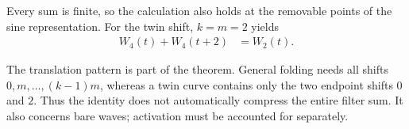 Every sum is finite, so the calculation also holds at the removable points
of the sine representation. For the twin shift, $k=m=2$ yields
\begin{equation*}
\begin{aligned}
W_4(t)+W_4(t+2)&=W_2(t).
\end{aligned}
\end{equation*}

The translation pattern is part of the theorem. General folding needs all
shifts $0,m,\ldots,(k-1)m$, whereas a twin curve contains only the two
endpoint shifts $0$ and $2$. Thus the identity does not automatically compress
the entire filter sum. It also concerns bare waves; activation must be
accounted for separately.
